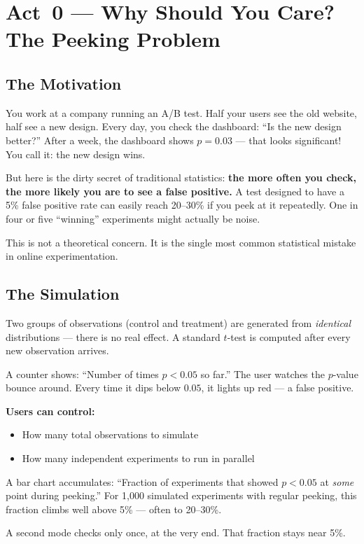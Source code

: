 \documentclass[12pt, a4paper]{article}
\begin{document}
\newpage
\section{Act~0 --- Why Should You Care?  The Peeking Problem}

\subsection{The Motivation}

\begin{intuition}
You work at a company running an A/B test.  Half your users see the old
website, half see a new design.  Every day, you check the dashboard:
``Is the new design better?''  After a week, the dashboard shows $p=0.03$ ---
that looks significant!  You call it: the new design wins.

But here is the dirty secret of traditional statistics: \textbf{the more often
you check, the more likely you are to see a false positive.}  A test designed
to have a 5\% false positive rate can easily reach 20--30\% if you peek at it
repeatedly.  One in four or five ``winning'' experiments might actually be noise.

This is not a theoretical concern.  It is the single most common statistical
mistake in online experimentation.
\end{intuition}

\subsection{The Simulation}

\begin{simulation}
Two groups of observations (control and treatment) are generated from
\emph{identical} distributions --- there is no real effect.  A standard
$t$-test is computed after every new observation arrives.

A counter shows: ``Number of times $p<0.05$ so far.''  The user watches the
$p$-value bounce around.  Every time it dips below $0.05$, it lights up red ---
a false positive.

\textbf{Users can control:}
\begin{itemize}[nosep]
  \item How many total observations to simulate
  \item How many independent experiments to run in parallel
\end{itemize}

A bar chart accumulates: ``Fraction of experiments that showed $p<0.05$ at
\emph{some} point during peeking.''  For 1,000 simulated experiments with
regular peeking, this fraction climbs well above 5\% --- often to 20--30\%.

A second mode checks only once, at the very end.  That fraction stays near 5\%.
\end{simulation}
\end{document}
